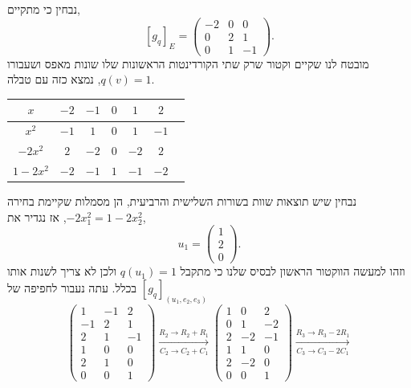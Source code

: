 \begin{solution}
	נבחין כי מתקיים,
	\[
		{[g_q]}_E
		= \begin{pmatrix}
			-2 & 0 & 0 \\
			0 & 2 & 1 \\
			0 & 1 & -1
		\end{pmatrix}
	.\]
	מובטח לנו שקיים וקטור שרק שתי הקורדינטות הראשונות שלו שונות מאפס ושעבורו $q(v) = 1$, נמצא כזה עם טבלה.
	\begin{otherlanguage}{english}
		\begin{center}
			\begin{tabular}{c | c c c c c c}
				$x$ & $-2$ & $-1$ & $0$ & $1$ & $2$ \\
				\hline
				$x^2$ & $-1$ & $1$ & $0$ & $1$ & $-1$ \\
				\hline
				$-2x^2$ & $2$ & $-2$ & $0$ & $-2$ & $2$ \\
				\hline
				$1 - 2x^2$ & $-2$ & $-1$ & $1$ & $-1$ & $-2$ \\
			\end{tabular}
		\end{center}
	\end{otherlanguage}
	נבחין שיש תוצאות שוות בשורות השלישית והרביעית, הן מסמלות שקיימת בחירה $-2x_1^2 = 1 - 2x_2^2$,
	אז נגדיר את,
	\[
		u_1
		= \begin{pmatrix} 1 \\ 2 \\ 0 \end{pmatrix}
	.\]
	וזהו למעשה הווקטור הראשון לבסיס שלנו כי מתקבל $q(u_1) = 1$ ולכן לא צריך לשנות אותו בכלל.
	עתה נעבור לחפיפה של ${[g_q]}_{(u_1, e_2, e_3)}$
	\[
		\begin{pmatrix}
			1 & -1 & 2 \\
			-1 & 2 & 1 \\
			2 & 1 & -1 \\
			\hline
			1 & 0 & 0 \\
			2 & 1 & 0 \\
			0 & 0 & 1
		\end{pmatrix}
		\xrightarrow[C_2 \to C_2 + C_1]{R_2 \to R_2 + R_1}
		\begin{pmatrix}
			1 & 0 & 2 \\
			0 & 1 & -2 \\
			2 & -2 & -1 \\
			\hline
			1 & 1 & 0 \\
			2 & -2 & 0 \\
			0 & 0 & 1
		\end{pmatrix}
		\xrightarrow[C_3 \to C_3 - 2 C_1]{R_3 \to R_3 - 2 R_1}
\]
\end{solution}
